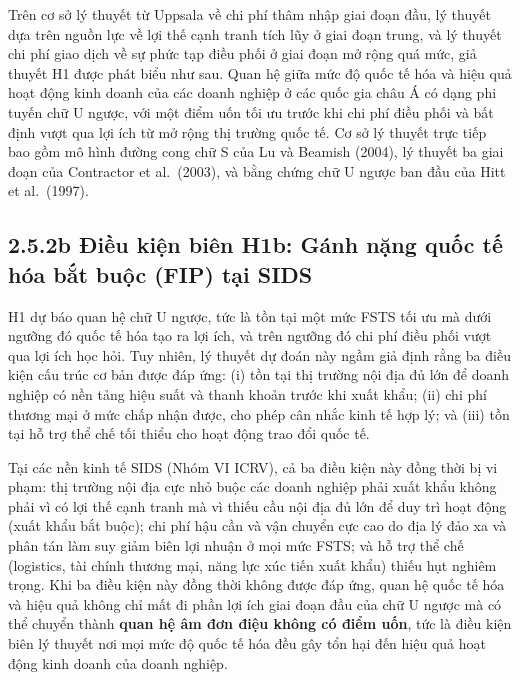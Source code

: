 \documentclass[
  a4paper,
  13pt]{extreport}
\begin{document}
Trên cơ sở lý thuyết từ Uppsala về chi phí thâm nhập giai đoạn đầu, lý
thuyết dựa trên nguồn lực về lợi thế cạnh tranh tích lũy ở giai đoạn
trung, và lý thuyết chi phí giao dịch về sự phức tạp điều phối ở giai
đoạn mở rộng quá mức, giả thuyết H1 được phát biểu như sau. Quan hệ giữa
mức độ quốc tế hóa và hiệu quả hoạt động kinh doanh của các doanh nghiệp
ở các quốc gia châu Á có dạng phi tuyến chữ U ngược, với một điểm uốn
tối ưu trước khi chi phí điều phối và bất định vượt qua lợi ích từ mở
rộng thị trường quốc tế. Cơ sở lý thuyết trực tiếp bao gồm mô hình đường
cong chữ S của Lu và Beamish (2004), lý thuyết ba giai đoạn của
Contractor et al.~(2003), và bằng chứng chữ U ngược ban đầu của Hitt et
al.~(1997).

\hypertarget{b-ux111iux1ec1u-kiux1ec7n-biuxean-h1b-guxe1nh-nux1eb7ng-quux1ed1c-tux1ebf-huxf3a-bux1eaft-buux1ed9c-fip-tux1ea1i-sids}{%
\subsection{2.5.2b Điều kiện biên H1b: Gánh nặng quốc tế hóa bắt buộc
(FIP) tại
SIDS}\label{b-ux111iux1ec1u-kiux1ec7n-biuxean-h1b-guxe1nh-nux1eb7ng-quux1ed1c-tux1ebf-huxf3a-bux1eaft-buux1ed9c-fip-tux1ea1i-sids}}

H1 dự báo quan hệ chữ U ngược, tức là tồn tại một mức FSTS tối ưu mà
dưới ngưỡng đó quốc tế hóa tạo ra lợi ích, và trên ngưỡng đó chi phí
điều phối vượt qua lợi ích học hỏi. Tuy nhiên, lý thuyết dự đoán này
ngầm giả định rằng ba điều kiện cấu trúc cơ bản được đáp ứng: (i) tồn
tại thị trường nội địa đủ lớn để doanh nghiệp có nền tảng hiệu suất và
thanh khoản trước khi xuất khẩu; (ii) chi phí thương mại ở mức chấp nhận
được, cho phép cân nhắc kinh tế hợp lý; và (iii) tồn tại hỗ trợ thể chế
tối thiểu cho hoạt động trao đổi quốc tế.

Tại các nền kinh tế SIDS (Nhóm VI ICRV), cả ba điều kiện này đồng thời
bị vi phạm: thị trường nội địa cực nhỏ buộc các doanh nghiệp phải xuất
khẩu không phải vì có lợi thế cạnh tranh mà vì thiếu cầu nội địa đủ lớn
để duy trì hoạt động (xuất khẩu bắt buộc); chi phí hậu cần và vận chuyển
cực cao do địa lý đảo xa và phân tán làm suy giảm biên lợi nhuận ở mọi
mức FSTS; và hỗ trợ thể chế (logistics, tài chính thương mại, năng lực
xúc tiến xuất khẩu) thiếu hụt nghiêm trọng. Khi ba điều kiện này đồng
thời không được đáp ứng, quan hệ quốc tế hóa và hiệu quả không chỉ mất
đi phần lợi ích giai đoạn đầu của chữ U ngược mà có thể chuyển thành
\textbf{quan hệ âm đơn điệu không có điểm uốn}, tức là điều kiện biên lý
thuyết nơi mọi mức độ quốc tế hóa đều gây tổn hại đến hiệu quả hoạt động
kinh doanh của doanh nghiệp.
\end{document}
